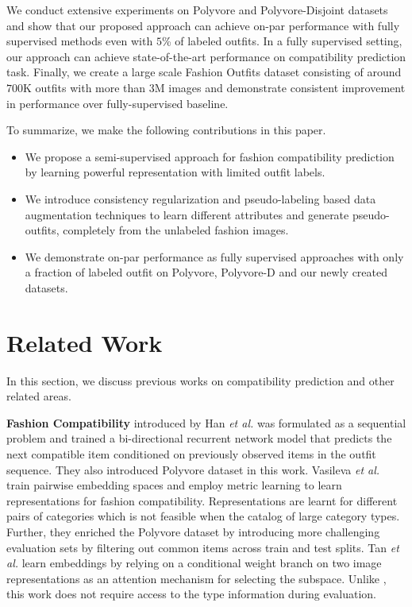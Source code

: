 \documentclass[sigconf]{acmart}
\newcommand{\etal}{\textit{et al.}}
\begin{document}
We conduct extensive experiments on Polyvore and Polyvore-Disjoint \cite{eccv2018learning} datasets and show that our proposed approach can achieve on-par performance with fully supervised methods even with $5$\% of labeled outfits. In a fully supervised setting, our approach can achieve state-of-the-art performance on compatibility prediction task. Finally, we create a large scale Fashion Outfits dataset consisting of around $700$K outfits with more than $3$M images and demonstrate consistent improvement in performance over fully-supervised baseline. 

\vspace{1mm}

To summarize, we make the following contributions in this paper.

\begin{itemize}
\item We propose a semi-supervised approach for fashion compatibility prediction by learning powerful representation with limited outfit labels.

\item We introduce consistency regularization and pseudo-labeling based data augmentation techniques to learn different attributes and generate pseudo-outfits, completely from the unlabeled fashion images.

\item We demonstrate on-par performance as fully supervised approaches with only a fraction of labeled outfit on Polyvore, Polyvore-D and our newly created datasets.
\end{itemize} 

\section{Related Work}
In this section, we discuss previous works on compatibility prediction and other related areas.

\vspace{1mm} 

\noindent \textbf{Fashion Compatibility} introduced by Han \etal \cite{bilstm} was formulated as a sequential problem and trained a bi-directional recurrent network model that predicts the next compatible item conditioned on previously observed items in the outfit sequence. They also introduced Polyvore dataset in this work. Vasileva \etal \cite{eccv2018learning} train pairwise embedding spaces and employ metric learning to learn representations for fashion compatibility. Representations are learnt for different pairs of categories which is not feasible when the catalog of large category types. Further, they enriched the Polyvore dataset by introducing more challenging evaluation sets by filtering out common items across train and test splits. Tan \etal \cite{iccv2019learning} learn embeddings by relying on a conditional weight branch on two image representations as an attention mechanism for selecting the subspace. Unlike \cite{eccv2018learning}, this work does not require access to the type information during evaluation. 
\end{document}
